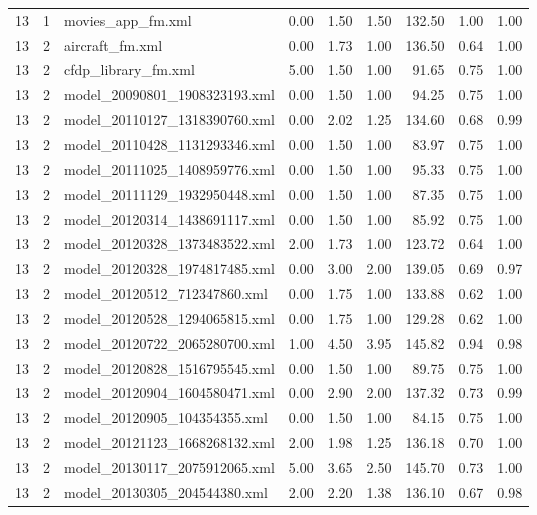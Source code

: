 \begin{table}[ht]
\begin{tabular}{rrlrrrrrr}
   13 &   1 & movies\_app\_fm.xml & 0.00 & 1.50 & 1.50 & 132.50 & 1.00 & 1.00 \\ 
   13 &   2 & aircraft\_fm.xml & 0.00 & 1.73 & 1.00 & 136.50 & 0.64 & 1.00 \\ 
   13 &   2 & cfdp\_library\_fm.xml & 5.00 & 1.50 & 1.00 & 91.65 & 0.75 & 1.00 \\ 
   13 &   2 & model\_20090801\_1908323193.xml & 0.00 & 1.50 & 1.00 & 94.25 & 0.75 & 1.00 \\ 
   13 &   2 & model\_20110127\_1318390760.xml & 0.00 & 2.02 & 1.25 & 134.60 & 0.68 & 0.99 \\ 
   13 &   2 & model\_20110428\_1131293346.xml & 0.00 & 1.50 & 1.00 & 83.97 & 0.75 & 1.00 \\ 
   13 &   2 & model\_20111025\_1408959776.xml & 0.00 & 1.50 & 1.00 & 95.33 & 0.75 & 1.00 \\ 
   13 &   2 & model\_20111129\_1932950448.xml & 0.00 & 1.50 & 1.00 & 87.35 & 0.75 & 1.00 \\ 
   13 &   2 & model\_20120314\_1438691117.xml & 0.00 & 1.50 & 1.00 & 85.92 & 0.75 & 1.00 \\ 
   13 &   2 & model\_20120328\_1373483522.xml & 2.00 & 1.73 & 1.00 & 123.72 & 0.64 & 1.00 \\ 
   13 &   2 & model\_20120328\_1974817485.xml & 0.00 & 3.00 & 2.00 & 139.05 & 0.69 & 0.97 \\ 
   13 &   2 & model\_20120512\_712347860.xml & 0.00 & 1.75 & 1.00 & 133.88 & 0.62 & 1.00 \\ 
   13 &   2 & model\_20120528\_1294065815.xml & 0.00 & 1.75 & 1.00 & 129.28 & 0.62 & 1.00 \\ 
   13 &   2 & model\_20120722\_2065280700.xml & 1.00 & 4.50 & 3.95 & 145.82 & 0.94 & 0.98 \\ 
   13 &   2 & model\_20120828\_1516795545.xml & 0.00 & 1.50 & 1.00 & 89.75 & 0.75 & 1.00 \\ 
   13 &   2 & model\_20120904\_1604580471.xml & 0.00 & 2.90 & 2.00 & 137.32 & 0.73 & 0.99 \\ 
   13 &   2 & model\_20120905\_104354355.xml & 0.00 & 1.50 & 1.00 & 84.15 & 0.75 & 1.00 \\ 
   13 &   2 & model\_20121123\_1668268132.xml & 2.00 & 1.98 & 1.25 & 136.18 & 0.70 & 1.00 \\ 
   13 &   2 & model\_20130117\_2075912065.xml & 5.00 & 3.65 & 2.50 & 145.70 & 0.73 & 1.00 \\ 
   13 &   2 & model\_20130305\_204544380.xml & 2.00 & 2.20 & 1.38 & 136.10 & 0.67 & 0.98 \\ 

\end{tabular}
\end{table}
